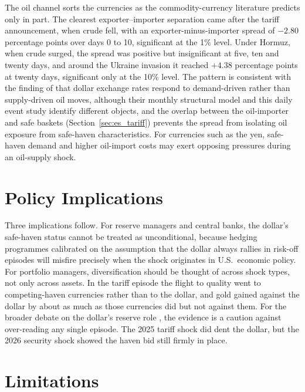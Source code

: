The oil channel sorts the currencies as the commodity-currency literature predicts only in part. The clearest exporter--importer separation came after the tariff announcement, when crude fell, with an exporter-minus-importer spread of $-2.80$ percentage points over days 0 to 10, significant at the 1\% level. Under Hormuz, when crude surged, the spread was positive but insignificant at five, ten and twenty days, and around the Ukraine invasion it reached $+4.38$ percentage points at twenty days, significant only at the 10\% level. The pattern is consistent with the finding of \textcite{chen_liu_wang_zhu_2016} that dollar exchange rates respond to demand-driven rather than supply-driven oil moves, although their monthly structural model and this daily event study identify different objects, and the overlap between the oil-importer and safe baskets (Section~\ref{sec:es_tariff}) prevents the spread from isolating oil exposure from safe-haven characteristics. For currencies such as the yen, safe-haven demand and higher oil-import costs may exert opposing pressures during an oil-supply shock.

\section{Policy Implications}
\label{sec:disc_policy}

Three implications follow. For reserve managers and central banks, the dollar's safe-haven
status cannot be treated as unconditional, because hedging programmes calibrated on the assumption
that the dollar always rallies in risk-off episodes will misfire precisely when the shock
originates in U.S.\ economic policy. For portfolio managers, diversification should be
thought of across shock types, not only across assets. In the tariff episode the flight to quality went to competing-haven currencies rather than to the dollar, and gold gained against the dollar by about as much as those currencies did but not against them. For the
broader debate on the dollar's reserve role \parencite{obstfeld_zhou_2023,jiang_krishnamurthy_lustig_richmond_2026}, the evidence
is a caution against over-reading any single episode. The 2025 tariff shock did dent the
dollar, but the 2026 security shock showed the haven bid still firmly in place.

\section{Limitations}
\label{sec:disc_limitations}

